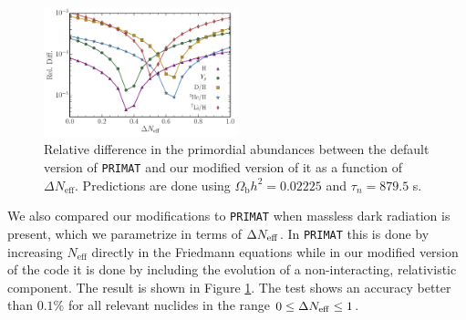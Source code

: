 \begin{figure}[t]
    \centering
    \includegraphics[width=0.5\textwidth]{figures/Neffcheck.pdf}\vspace{-0.5cm}
    \caption{Relative difference in the primordial abundances between the default version of \texttt{PRIMAT} and our modified version of it as a function of $\Delta N_{\mathrm{eff}}$. Predictions are done using $\Omega_{\mathrm{b}} h^2 = 0.02225$ and $\tau_n = 879.5$ s.}
    \label{fig:CheckDeltaNeff}
\end{figure}

\noindent We also compared our modifications to \texttt{PRIMAT} when massless dark radiation is present, which we parametrize in terms of $\Delta N_{\rm eff}$. In \texttt{PRIMAT} this is done by increasing $N_{\mathrm{eff}}$ directly in the Friedmann equations while in our modified version of the code it is done by including the evolution of a non-interacting, relativistic component. The result is shown in Figure \ref{fig:CheckDeltaNeff}.
The test shows an accuracy better than $0.1\%$ for all relevant nuclides in the range $0 \leq \Delta N_{\rm eff} \leq 1$.


